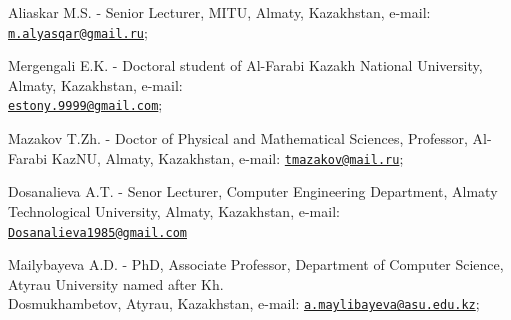 \begin{authorinfo}
Aliaskar M.S. - Senior Lecturer, MITU, Almaty, Kazakhstan, e-mail:
\href{mailto:m.alyasqar@gmail.ru}{\nolinkurl{m.alyasqar@gmail.ru}};

Mergengali E.K. - Doctoral student of Al-Farabi Kazakh National
University, Almaty, Kazakhstan, e-mail:\\
\href{mailto:estony.9999@gmail.com}{\nolinkurl{estony.9999@gmail.com}};

Mazakov T.Zh. - Doctor of Physical and Mathematical Sciences, Professor,
Al-Farabi KazNU, Almaty, Kazakhstan, e-mail:
\href{mailto:tmazakov@mail.ru}{\nolinkurl{tmazakov@mail.ru}};

Dosanalieva A.T. - Senor Lecturer, Computer Engineering Department,
Almaty Technological University, Almaty, Kazakhstan, e-mail:
\href{mailto:Dosanalieva1985@gmail.com}{\nolinkurl{Dosanalieva1985@gmail.com}}

Mailybayeva A.D. - PhD, Associate Professor, Department of Computer
Science, Atyrau University named after Kh. \\Dosmukhambetov, Atyrau,
Kazakhstan, e-mail:
\href{mailto:a.maylibayeva@asu.edu.kz}{\nolinkurl{a.maylibayeva@asu.edu.kz}};
\end{authorinfo}
